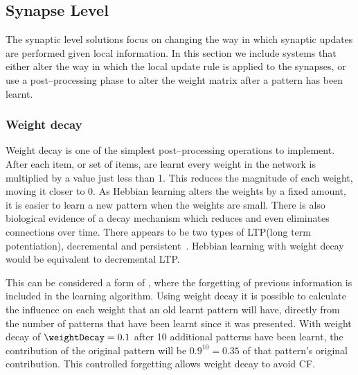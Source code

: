 \subsection{Synapse Level}
The synaptic level solutions focus on changing the way in which synaptic updates are performed given local information.  In this section we include systems that either alter the way in which the local update rule is applied to the synapses, or use a post--processing phase to alter the weight matrix after a pattern has been learnt.

\subsubsection{Weight decay}

Weight decay is one of the simplest post--processing operations to implement.  After each item, or set of items, are learnt every weight in the network is multiplied by a value just less than 1.  This reduces the magnitude of each weight, moving it closer to 0.  As Hebbian learning alters the weights by a fixed amount, it is easier to learn a new pattern when the weights are small.   There is also biological evidence of a decay mechanism which reduces and even eliminates connections over time.  There appears to be two types of LTP(long term potentiation), decremental and persistent~\citep{Abraham2003}.  Hebbian learning with weight decay would be equivalent to decremental LTP.  

This can be considered a form of , where the forgetting of previous information is included in the learning algorithm.  Using weight decay it is possible to calculate the influence on each weight that an old learnt pattern will have, directly from the number of patterns that have been learnt since it was presented.  With weight decay of $\weightDecay = 0.1$ after 10 additional patterns have been learnt, the contribution of the original pattern will be $0.9^{10} = 0.35$ of that pattern's original contribution.  This controlled forgetting allows weight decay to avoid CF. 

